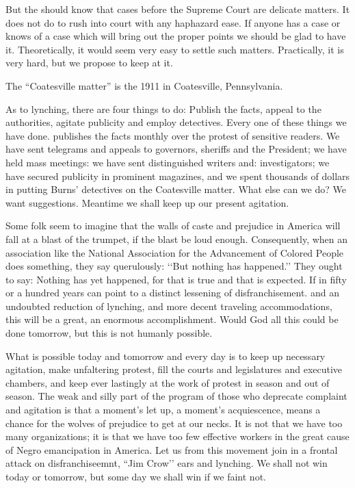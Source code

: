 \documentclass[letterpaper,10pt,english]{jupyterBook}
\begin{document}
\sphinxAtStartPar
But the  should know that cases before the Supreme Court are delicate matters. It does not do to rush into court with any haphazard ease. If anyone has a case or knows of a case which will bring out the proper points we should be glad to have it. Theoretically, it would seem very easy to settle such matters. Practically, it is very hard, but we propose to keep at it.

\begin{sphinxShadowBox}
\sphinxstylesidebartitle{}

\sphinxAtStartPar
The “Coatesville matter” is the 1911  in Coatesville, Pennsylvania.
\end{sphinxShadowBox}

\sphinxAtStartPar
As to lynching, there are four things to do: Publish the facts, appeal to the authorities, agitate publicity and employ detectives. Every one of these things we have done.  publishes the facts monthly over the protest of sensitive readers. We have sent telegrams and appeals to governors, sheriffs and the President; we have held mass meetings: we have sent distinguished writers and: investigators; we have secured publicity in prominent magazines, and we spent thousands of dollars in putting Burns’ detectives on the Coatesville matter.
What else can we do? We want suggestions. Meantime we shall keep up our present agitation.

\sphinxAtStartPar
Some folk seem to imagine that the walls of caste and prejudice in America will fall at a blast of the trumpet, if the blast be loud enough. Consequently, when an association like the National Association for the Advancement of Colored People does something, they say querulously: ‘‘But nothing has happened.’’ They ought to say: Nothing has yet happened, for that is true and that is expected. If in fifty or a hundred years  can point to a distinct lessening of disfranchisement. and an undoubted reduction of lynching, and more decent traveling accommodations, this will be a great, an enormous accomplishment. Would God all this could be done to\sphinxhyphen{}morrow, but this is not humanly possible.

\sphinxAtStartPar
What is possible to\sphinxhyphen{}day and tomorrow and every day is to keep up necessary agitation, make unfaltering protest, fill the courts and legislatures and executive chambers, and keep ever lastingly at the work of protest in season and out of season. The weak and silly part of the program of those who deprecate complaint and agitation is that a moment’s let up, a moment’s acquiescence, means a chance for the wolves of prejudice to get at our necks. It is not that we have too many organizations; it is that we have too few effective workers in the great cause of Negro emancipation in America. Let us from this movement join in a frontal attack on disfranchiseemnt, “Jim Crow’’ ears and lynching. We shall not win today or to\sphinxhyphen{}morrow, but some day we shall win if we faint not.
\end{document}
